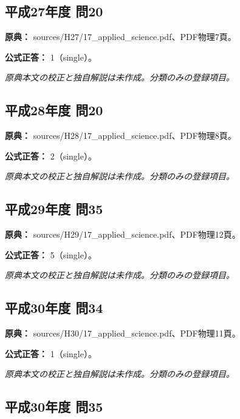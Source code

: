 \subsection{平成27年度 問20}
\label{q:h27-reg-applied-20}

\noindent\textbf{原典：} sources/H27/17\_applied\_science.pdf、PDF物理7頁。

\textbf{公式正答：} 1（single）。

\par\textit{原典本文の校正と独自解説は未作成。分類のみの登録項目。}

\subsection{平成28年度 問20}
\label{q:h28-reg-applied-20}

\noindent\textbf{原典：} sources/H28/17\_applied\_science.pdf、PDF物理8頁。

\textbf{公式正答：} 2（single）。

\par\textit{原典本文の校正と独自解説は未作成。分類のみの登録項目。}

\subsection{平成29年度 問35}
\label{q:h29-reg-applied-35}

\noindent\textbf{原典：} sources/H29/17\_applied\_science.pdf、PDF物理12頁。

\textbf{公式正答：} 5（single）。

\par\textit{原典本文の校正と独自解説は未作成。分類のみの登録項目。}

\subsection{平成30年度 問34}
\label{q:h30-reg-applied-34}

\noindent\textbf{原典：} sources/H30/17\_applied\_science.pdf、PDF物理11頁。

\textbf{公式正答：} 1（single）。

\par\textit{原典本文の校正と独自解説は未作成。分類のみの登録項目。}

\subsection{平成30年度 問35}
\label{q:h30-reg-applied-35}

